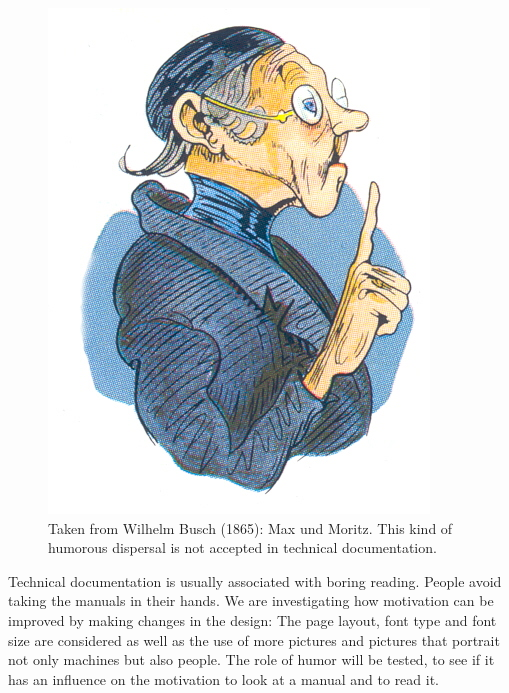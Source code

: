 \begin{figure}[h]
  \begin{center}
    \begin{minipage}[b]{0.35\linewidth}
   \includegraphics[width=\linewidth]{profClemensSchwender-fig1.jpg}
    \end{minipage}\hfill
    \begin{minipage}[b]{0.55\linewidth}
      \caption{Taken from Wilhelm Busch (1865): Max und Moritz. This kind of humorous dispersal is not accepted in technical documentation.\label{fig1:profClemensSchwender}}
    \end{minipage}
  \end{center}
\end{figure}

 Technical documentation is usually associated with boring reading. People avoid taking the manuals in their hands. We are investigating how motivation can be improved by making changes in the design: The page layout, font type and font size are considered as well as the use of more pictures and pictures that portrait not only machines but also people. The role of humor will be tested, to see if it has an influence on the motivation to look at a manual and to read it.


